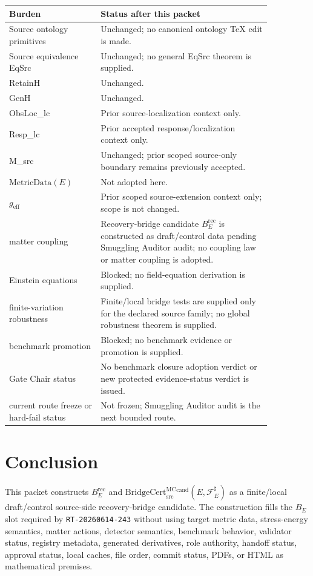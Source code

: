 \documentclass[11pt]{article}
\newcommand{\geff}{g_{\mathrm{eff}}}
\newcommand{\MetricData}{\mathrm{MetricData}}
\newcommand{\BridgeCert}{\mathrm{BridgeCert}_{\mathrm{src}}^{\mathrm{MC}}}
\begin{document}
\begin{longtable}{p{0.30\linewidth}p{0.56\linewidth}}
\toprule
Burden & Status after this packet \\
\midrule
Source ontology primitives & Unchanged; no canonical ontology TeX edit is made. \\
Source equivalence EqSrc & Unchanged; no general EqSrc theorem is supplied. \\
RetainH & Unchanged. \\
GenH & Unchanged. \\
ObsLoc\_lc & Prior source-localization context only. \\
Resp\_lc & Prior accepted response/localization context only. \\
M\_src & Unchanged; prior scoped source-only boundary remains previously accepted. \\
\(\MetricData(E)\) & Not adopted here. \\
\(\geff\) & Prior scoped source-extension context only; scope is not changed. \\
matter coupling & Recovery-bridge candidate \(B_E^{\mathrm{rec}}\) is constructed as draft/control data pending Smuggling Auditor audit; no coupling law or matter coupling is adopted. \\
Einstein equations & Blocked; no field-equation derivation is supplied. \\
finite-variation robustness & Finite/local bridge tests are supplied only for the declared source family; no global robustness theorem is supplied. \\
benchmark promotion & Blocked; no benchmark evidence or promotion is supplied. \\
Gate Chair status & No benchmark closure adoption verdict or new protected evidence-status verdict is issued. \\
current route freeze or hard-fail status & Not frozen; Smuggling Auditor audit is the next bounded route. \\
\bottomrule
\end{longtable}

\section{Conclusion}

This packet constructs \(B_E^{\mathrm{rec}}\) and
\(\BridgeCert^{\mathrm{cand}}(E,\mathcal{F}_E^\sharp)\) as a finite/local
draft/control source-side recovery-bridge candidate. The construction fills
the \(B_E\) slot required by \texttt{RT-20260614-243} without using target
metric data, stress-energy semantics, matter actions, detector semantics,
benchmark behavior, validator status, registry metadata, generated
derivatives, role authority, handoff status, approval status, local caches,
file order, commit status, PDFs, or HTML as mathematical premises.
\end{document}
